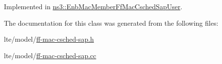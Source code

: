Implemented in \hyperlink{classns3_1_1EnbMacMemberFfMacCschedSapUser_ab426d981fee26df0d6e0414ebf3b9079}{ns3\+::\+Enb\+Mac\+Member\+Ff\+Mac\+Csched\+Sap\+User}.



The documentation for this class was generated from the following files\+:\begin{DoxyCompactItemize}
\item 
lte/model/\hyperlink{ff-mac-csched-sap_8h}{ff-\/mac-\/csched-\/sap.\+h}\item 
lte/model/\hyperlink{ff-mac-csched-sap_8cc}{ff-\/mac-\/csched-\/sap.\+cc}\end{DoxyCompactItemize}
